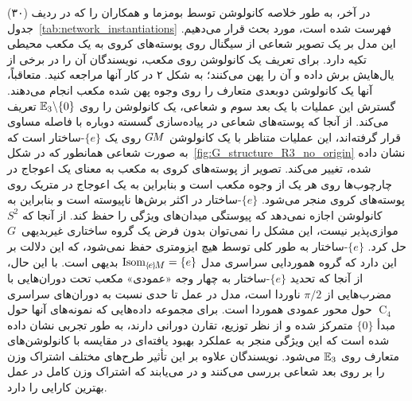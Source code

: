 در آخر، به طور خلاصه کانولوشن توسط بومزما و همکاران  \cite{boomsma2017spherical} را که در ردیف (۳۰) جدول~\ref{tab:network_instantiations} فهرست شده است، مورد بحث قرار می‌دهیم.
این مدل بر یک تصویر شعاعی از سیگنال روی پوسته‌های کروی به یک مکعب محیطی تکیه دارد.
برای تعریف یک کانولوشن روی مکعب، نویسندگان آن را در برخی از یال‌هایش برش داده و آن را پهن می‌کنند؛ به شکل ۲ در کار آنها مراجعه کنید.
متعاقباً، آنها یک کانولوشن دوبعدی متعارف را روی وجوه پهن شده مکعب انجام می‌دهند.
گسترش این عملیات با یک بعد سوم و شعاعی، یک کانولوشن را روی $\mathbb{E}_3 \backslash \{0\}$ تعریف می‌کند.
از آنجا که پوسته‌های شعاعی در پیاده‌سازی گسسته دوباره با فاصله مساوی قرار گرفته‌اند، این عملیات متناظر با یک کانولوشن $G\mkern-1.4muM$ روی یک $\{e\}$-ساختار است که به صورت شعاعی همانطور که در شکل~\ref{fig:G_structure_R3_no_origin} نشان داده شده، تغییر می‌کند.
تصویر از پوسته‌های کروی به مکعب به معنای یک اعوجاج در چارچوب‌ها روی هر یک از وجوه مکعب است و بنابراین به یک اعوجاج در متریک روی پوسته‌های کروی منجر می‌شود.
$\{e\}$-ساختار در اکثر برش‌ها ناپیوسته است و بنابراین به کانولوشن اجازه نمی‌دهد که پیوستگی میدان‌های ویژگی را حفظ کند.
از آنجا که $S^2$ موازی‌پذیر نیست، این مشکل را نمی‌توان بدون فرض یک گروه ساختاری غیربدیهی~$G$ حل کرد.
$\{e\}$-ساختار به طور کلی توسط هیچ ایزومتری حفظ نمی‌شود، که این دلالت بر این دارد که گروه هموردایی سراسری مدل $\IsomeM = \{e\}$ بدیهی است.
با این حال، از آنجا که تحدید $\{e\}$-ساختار به چهار وجه «عمودی» مکعب تحت دوران‌هایی با مضرب‌هایی از $\pi/2$ ناوردا است، مدل در عمل تا حدی نسبت به دوران‌های سراسری $\operatorname{C}_4$ حول محور عمودی هموردا است.
برای مجموعه داده‌هایی که نمونه‌های آنها حول مبدأ $\{0\}$ متمرکز شده و از نظر توزیع، تقارن دورانی دارند، به طور تجربی نشان داده شده است که این ویژگی منجر به عملکرد بهبود یافته‌ای در مقایسه با کانولوشن‌های متعارف روی $\mathbb{E}_3$ می‌شود.
نویسندگان علاوه بر این تأثیر طرح‌های مختلف اشتراک وزن را بر روی بعد شعاعی بررسی می‌کنند و در می‌یابند که اشتراک وزن کامل در عمل بهترین کارایی را دارد.